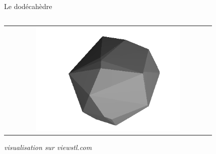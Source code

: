 \begin{frame}{Le dodécahèdre}
\begin{minipage}{0.40\textwidth}
\begin{tabular}{cc}
    \end{tabular}
\end{minipage}%
\hfill
\begin{minipage}{0.60\textwidth}
    \centering
    \setlength{\tabcolsep}{0pt}
    \renewcommand{\arraystretch}{0}
    \begin{tabular}{c}
        \includegraphics[width=0.72\textwidth]{capture/dodec_vrai.png} \\
    \end{tabular}
    \vspace{0.5em}

    {\tiny \textit{visualisation sur viewstl.com}}
\end{minipage}
\end{frame}


